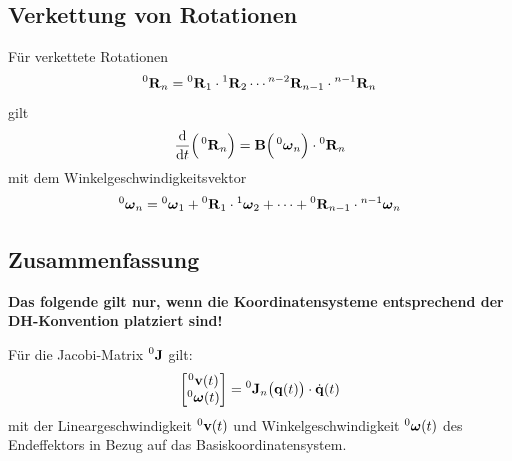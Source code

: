 		\subsection{Verkettung von Rotationen}
			Für verkettete Rotationen
			\begin{equation*}
				\prescript{0}{}{\boldsymbol{\mathrm{R}}}_n = \prescript{0}{}{\boldsymbol{\mathrm{R}}}_1 \cdot \prescript{1}{}{\boldsymbol{\mathrm{R}}}_2 \cdots \prescript{n - 2}{}{\boldsymbol{\mathrm{R}}}_{n - 1} \cdot \prescript{n - 1}{}{\boldsymbol{\mathrm{R}}}_n
			\end{equation*}
			gilt
			\begin{equation*}
				\dv{t} \Big( \prescript{0}{}{\boldsymbol{\mathrm{R}}}_n \Big) = \boldsymbol{\mathrm{B}}\Big(\prescript{0}{}{\boldsymbol{\mathrm{\omega}}}_n\Big) \cdot \prescript{0}{}{\boldsymbol{\mathrm{R}}}_n
			\end{equation*}
			mit dem Winkelgeschwindigkeitsvektor
			\begin{equation*}
				\prescript{0}{}{\boldsymbol{\mathrm{\omega}}}_n = \prescript{0}{}{\boldsymbol{\mathrm{\omega}}}_1 + \prescript{0}{}{\boldsymbol{\mathrm{R}}}_1 \cdot \prescript{1}{}{\boldsymbol{\mathrm{\omega}}}_2 + \cdots + \prescript{0}{}{\boldsymbol{\mathrm{R}}}_{n - 1} \cdot \prescript{n - 1}{}{\boldsymbol{\mathrm{\omega}}}_n
			\end{equation*}

		\subsection{Zusammenfassung}
			\textbf{Das folgende gilt nur, wenn die Koordinatensysteme entsprechend der DH-Konvention platziert sind!}
		
			Für die Jacobi-Matrix \( \prescript{0}{}{\boldsymbol{\mathrm{J}}} \) gilt:
			\begin{equation*}
				\begin{bmatrix}
					\prescript{0}{}{\boldsymbol{\mathrm{v}}}(t) \\
					\prescript{0}{}{\boldsymbol{\mathrm{\omega}}}(t)
				\end{bmatrix}
				=
				\prescript{0}{}{\boldsymbol{\mathrm{J}}}_n\big(\boldsymbol{\mathrm{q}}(t)\big) \cdot \dot{\boldsymbol{\mathrm{q}}}(t)
			\end{equation*}
			mit der Lineargeschwindigkeit \( \prescript{0}{}{\boldsymbol{\mathrm{v}}}(t) \) und Winkelgeschwindigkeit \( \prescript{0}{}{\boldsymbol{\mathrm{\omega}}}(t) \) des Endeffektors in Bezug auf das Basiskoordinatensystem.
			
